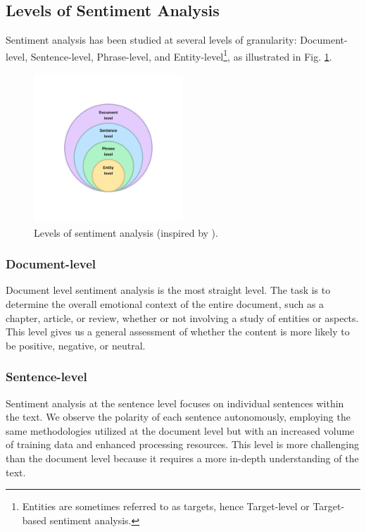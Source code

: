 \subsection{Levels of Sentiment Analysis}
\label{subsec:levels-of-sentiment-analysis}
Sentiment analysis has been studied at several levels of granularity: Document-level, Sentence-level, Phrase-level, and Entity-level\footnote{Entities are sometimes referred to as targets, hence Target-level or Target-based sentiment analysis.}, as illustrated in Fig. \ref{fig:sa-levels}.

\begin{figure}[H]
    \centering
    \includegraphics[width=0.5\textwidth]{img/sa-levels.pdf}
    \caption{Levels of sentiment analysis (inspired by \cite{Wankhade2022}).}
    \label{fig:sa-levels}
\end{figure}

\subsubsection*{Document-level}
\label{subsubsec:document-level}
Document level sentiment analysis is the most straight level. The task is to determine the overall emotional context of the entire document, such as a chapter, article, or review, whether or not involving a study of entities or aspects. This level gives us a general assessment of whether the content is more likely to be positive, negative, or neutral. 

\subsubsection*{Sentence-level}
\label{subsubsec:sentence-level}
Sentiment analysis at the sentence level focuses on individual sentences within the text. We observe the polarity of each sentence autonomously, employing the same methodologies utilized at the document level but with an increased volume of training data and enhanced processing resources. This level is more challenging than the document level because it requires a more in-depth understanding of the text. 

